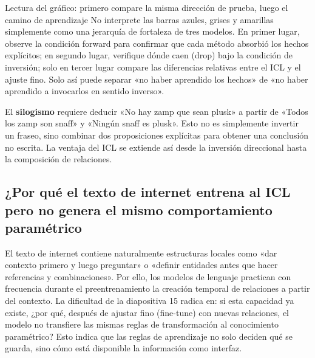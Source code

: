 \begin{knowledgebox}{Lectura del gráfico: primero compare la misma dirección de prueba, luego el camino de aprendizaje}
No interprete las barras azules, grises y amarillas simplemente como una jerarquía de fortaleza de tres modelos. En primer lugar, observe la condición forward para confirmar que cada método absorbió los hechos explícitos; en segundo lugar, verifique dónde caen (drop) bajo la condición de inversión; solo en tercer lugar compare las diferencias relativas entre el ICL y el ajuste fino. Solo así puede separar «no haber aprendido los hechos» de «no haber aprendido a invocarlos en sentido inverso».
\end{knowledgebox}


El \textbf{silogismo} requiere deducir «No hay zamp que sean plusk» a partir de «Todos los zamp son snaff» y «Ningún snaff es plusk». Esto no es simplemente invertir un fraseo, sino combinar dos proposiciones explícitas para obtener una conclusión no escrita. La ventaja del ICL se extiende así desde la inversión direccional hasta la composición de relaciones.



\subsection{¿Por qué el texto de internet entrena al ICL pero no genera el mismo comportamiento paramétrico}

El texto de internet contiene naturalmente estructuras locales como «dar contexto primero y luego preguntar» o «definir entidades antes que hacer referencias y combinaciones». Por ello, los modelos de lenguaje practican con frecuencia durante el preentrenamiento la creación temporal de relaciones a partir del contexto. La dificultad de la diapositiva 15 radica en: si esta capacidad ya existe, ¿por qué, después de ajustar fino (fine-tune) con nuevas relaciones, el modelo no transfiere las mismas reglas de transformación al conocimiento paramétrico? Esto indica que las reglas de aprendizaje no solo deciden qué se guarda, sino cómo está disponible la información como interfaz.

